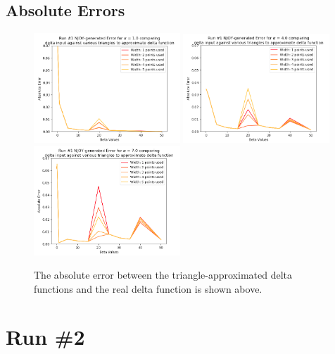 \documentclass[a4paper]{article}
\begin{document}
\subsection{Absolute Errors}
\begin{figure}[H]
\centering
\includegraphics[width=0.49\textwidth]{run1_absolute_error_alpha_equals_1.png}
\includegraphics[width=0.49\textwidth]{run1_absolute_error_alpha_equals_4.png}
\includegraphics[width=0.49\textwidth]{run1_absolute_error_alpha_equals_7.png}
\caption{\label{fig:run1_abs_error}The absolute error between the triangle-approximated delta functions and the real delta function is shown above. }
\end{figure}



\newpage


\section{Run \#2}
\end{document}
